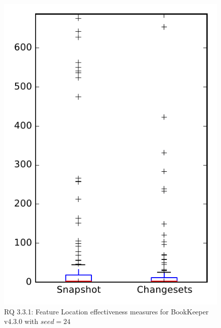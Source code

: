 
\begin{figure}
\centering
\includegraphics[height=0.4\textheight]{figures/flt_seed/rq1_bookkeeper_24}
\caption{RQ 3.3.1: Feature Location effectiveness measures for BookKeeper v4.3.0 with $seed=24$}
\label{fig:flt_seed:rq1:bookkeeper}
\end{figure}
